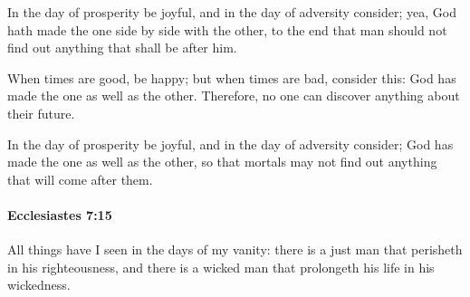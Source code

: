 			\begin{versebox}
					\item[BHS] 
					\item[LXX] 
					\item[ASV] In the day of prosperity be joyful, and in the day of adversity consider; yea, God hath made the one side by side with the other, to the end that man should not find out anything that shall be after him.
					\item[NIV] When times are good, be happy; but when times are bad, consider this: God has made the one as well as the other. Therefore, no one can discover anything about their future.
					\item[NRSV] In the day of prosperity be joyful, and in the day of adversity consider; God has made the one as well as the other, so that mortals may not find out anything that will come after them.
			\end{versebox}

		\paragraph{Ecclesiastes 7:15} %
			\label{ECCLESIASTES-7-15}

			All things have I seen in the days of my vanity: there is a just man that perisheth in his righteousness, and there is a wicked man that prolongeth his life in his wickedness.

